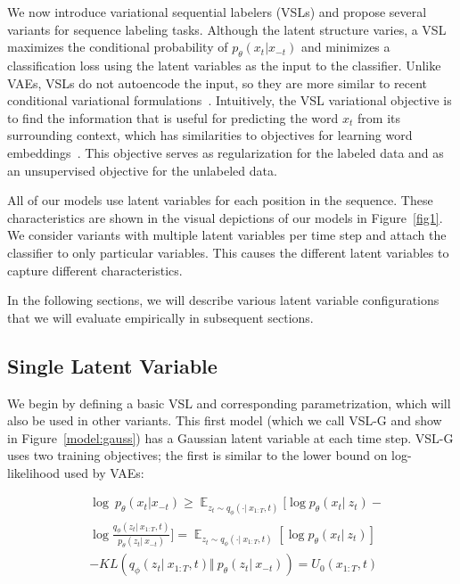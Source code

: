 \documentclass[11pt,a4paper]{article}
\newcommand{\vsmg}{VSL-G\xspace}
\newcommand{\kld}{\mathit{KL}}
\begin{document}
We now introduce variational sequential labelers (VSLs) and propose several variants for sequence labeling tasks. Although the latent structure varies, a VSL maximizes the conditional probability of $p_\theta(x_t\vert x_{-t})$ and minimizes a classification loss using the latent variables as the input to the classifier. Unlike VAEs, VSLs do not autoencode the input, so they are more similar
to recent conditional variational formulations~\citep{sohn2015learning,miao2016neural,zhou2017multi}.
Intuitively, the VSL variational objective is to find the information that is useful for predicting the word $x_t$ from its surrounding context, which has similarities to objectives for learning word embeddings~\citep{Collobert:2011:NLP:1953048.2078186,mikolov2013efficient}. This objective serves as regularization for the labeled data and as an unsupervised objective for the unlabeled data.

All of our models use latent variables for each position in the sequence. These characteristics are shown in the visual depictions of our models in Figure~\ref{fig1}.
We consider variants with multiple latent variables per time step and attach the classifier to only particular variables. This causes the different latent variables to capture different characteristics.

In the following sections, we will describe various latent variable configurations that we will evaluate empirically in subsequent sections.

\subsection{Single Latent Variable}

We begin by defining a basic VSL and corresponding parametrization, which will also be used in other variants. This first model (which we call \vsmg and show in Figure~\ref{model:gauss}) has a Gaussian latent variable at each time step. \vsmg uses two training objectives; the first is similar to the lower bound on log-likelihood used by VAEs:

\begin{equation}
\begin{aligned}
    &\log~p_\theta(x_t\vert x_{-t})\geq\mathop\mathbb{E}_{z_t\sim q_\phi(\cdot\vert~x_{1:T},t)}[\log p_\theta(x_t\vert~z_t)-\\
    &\log\frac{q_\phi(z_t\vert~x_{1:T},t)}{p_\theta(z_t\vert~x_{-t})} ]=\mathop\mathbb{E}_{z_t\sim q_\phi(\cdot\vert~x_{1:T},t)}[\log p_\theta(x_t\vert~z_t)]\\
    &-\kld(q_\phi(z_t\vert~x_{1:T},t)\Vert~p_\theta(z_t\vert~x_{-t}))=U_0(x_{1:T}, t)
\end{aligned}
\label{eq:rec_gaussian}
\end{equation}
\end{document}
